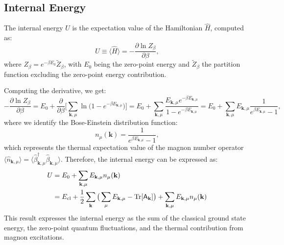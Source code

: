 \documentclass[aps, prx, nofootinbib, superscriptaddress]{revtex4-2}
\newcommand{\kvec}{\mathbf{k}}
\newcommand{\Tr}{\mathrm{Tr}}
\begin{document}
\subsection{Internal Energy}\label{subsec: Internal Energy}
The internal energy $U$ is the expectation value of the Hamiltonian $\hat{H}$, computed as:
\begin{equation}
    U \equiv \langle \hat{H} \rangle  = -\frac{\partial \ln Z_{\beta}}{\partial \beta},
\end{equation}
where $Z_{\beta} = e^{- \beta E_{0}} \tilde{Z}_{\beta}$, with $E_0$ being the zero-point energy and $\tilde{Z}_{\beta}$ the partition function excluding the zero-point energy contribution.

Computing the derivative, we get:
\begin{equation}
     - \frac{\partial \ln Z_{\beta}}{\partial \beta} 
    = E_{0} + \frac{\partial}{\partial \beta} \Big[  \sum_{\kvec, \mu} \ln \big( 1 - e^{- \beta E_{\kvec, \mu}} \big) \Big]
    = E_{0} + \sum_{\kvec, \mu} \frac{E_{\kvec, \mu} e^{-\beta E_{\kvec, \mu}}}{1 - e^{-\beta E_{\kvec, \mu}}}  
    = E_{0} + \sum_{\kvec, \mu} E_{\kvec, \mu} \frac{1}{e^{\beta E_{\kvec, \mu}} - 1},
\end{equation}
where we identify the Bose-Einstein distribution function:
\begin{equation}
    n_{\mu} (\kvec) = \frac{1}{e^{\beta E_{\kvec, \mu}} - 1},
\end{equation}
which represents the thermal expectation value of the magnon number operator $\langle\hat{n}_{\kvec, \mu}\rangle = \langle \hat{\beta}^{\dagger}_{\kvec, \mu} \hat{\beta}_{\kvec,\mu} \rangle$.
Therefore, the internal energy can be expressed as:
\begin{align}
    U &= E_0 + \sum_{\kvec, \mu} E_{\kvec, \mu} n_{\mu} (\kvec) \nonumber \\
    &= E_{\rm cl} + \frac{1}{2} \sum_{\kvec} \big( \sum_{\mu} E_{\kvec, \mu} - \Tr [\mathsf{A}_{\kvec}] \big) + \sum_{\kvec, \mu} E_{\kvec, \mu} n_{\mu}(\kvec)
\end{align}
This result expresses the internal energy as the sum of the classical ground state energy, the zero-point quantum fluctuations, and the thermal contribution from magnon excitations.
\end{document}
